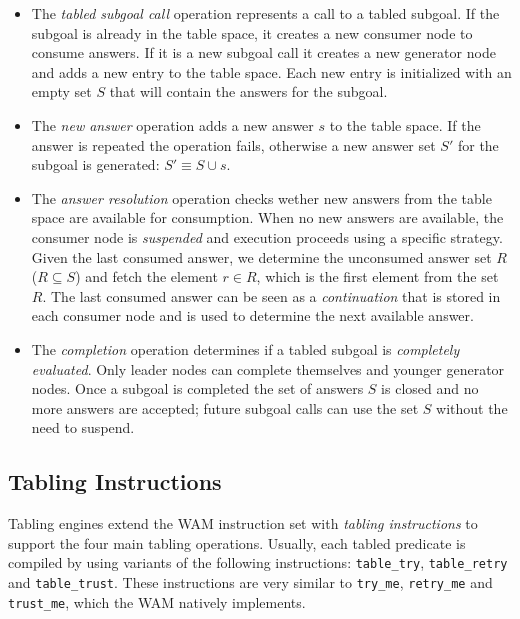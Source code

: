 \begin{itemize}
  \item The \textit{tabled subgoal call} operation represents a call to a tabled subgoal.
  If the subgoal is already in the table space, it creates a new consumer node to consume answers.
  If it is a new subgoal call it creates a new generator node and adds a new entry to the table space.
  Each new entry is initialized with an empty set $S$ that will contain the answers for the subgoal. 
  
  \item The \textit{new answer} operation adds a new answer $s$ to the table space. If the answer is repeated the operation fails,
  otherwise a new answer set $S'$ for the subgoal is generated: $S' \equiv S \cup {s}$.
  
  \item The \textit{answer resolution} operation checks wether new answers from the table space are available for consumption.
  When no new answers are available, the consumer node is \textit{suspended} and execution proceeds using a specific strategy.
  Given the last consumed answer, we determine the unconsumed answer
  set $R$ ($R \subseteq S$) and fetch the element $r \in R$, which is the first element from the set $R$. The last consumed answer
  can be seen as a \textit{continuation} that is stored in each consumer node and is used to determine the next available answer.
  
  \item The \textit{completion} operation determines if a tabled subgoal is \textit{completely evaluated}.
  Only leader nodes can complete themselves and younger generator nodes.
  Once a subgoal is completed the set of answers $S$ is closed and no more answers are accepted; future subgoal calls
  can use the set $S$ without the need to suspend.
\end{itemize}

\subsection{Tabling Instructions}

Tabling engines extend the WAM instruction set with \textit{tabling instructions} to support the four
main tabling operations. Usually, each tabled predicate is compiled by using
variants of the following instructions:
\texttt{table\_try}, \texttt{table\_retry} and \texttt{table\_trust}. These instructions
are very similar to \texttt{try\_me}, \texttt{retry\_me} and
\texttt{trust\_me}, which the WAM natively implements. 

